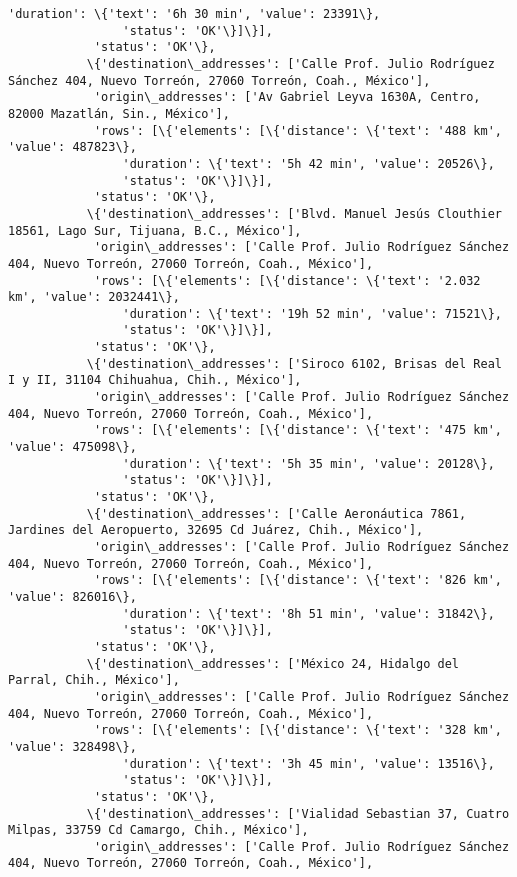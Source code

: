 \documentclass[11pt]{article}
\begin{document}
\begin{Verbatim}[commandchars=\\\{\}]
                'duration': \{'text': '6h 30 min', 'value': 23391\},
                'status': 'OK'\}]\}],
            'status': 'OK'\},
           \{'destination\_addresses': ['Calle Prof. Julio Rodríguez Sánchez 404, Nuevo Torreón, 27060 Torreón, Coah., México'],
            'origin\_addresses': ['Av Gabriel Leyva 1630A, Centro, 82000 Mazatlán, Sin., México'],
            'rows': [\{'elements': [\{'distance': \{'text': '488 km', 'value': 487823\},
                'duration': \{'text': '5h 42 min', 'value': 20526\},
                'status': 'OK'\}]\}],
            'status': 'OK'\},
           \{'destination\_addresses': ['Blvd. Manuel Jesús Clouthier 18561, Lago Sur, Tijuana, B.C., México'],
            'origin\_addresses': ['Calle Prof. Julio Rodríguez Sánchez 404, Nuevo Torreón, 27060 Torreón, Coah., México'],
            'rows': [\{'elements': [\{'distance': \{'text': '2.032 km', 'value': 2032441\},
                'duration': \{'text': '19h 52 min', 'value': 71521\},
                'status': 'OK'\}]\}],
            'status': 'OK'\},
           \{'destination\_addresses': ['Siroco 6102, Brisas del Real I y II, 31104 Chihuahua, Chih., México'],
            'origin\_addresses': ['Calle Prof. Julio Rodríguez Sánchez 404, Nuevo Torreón, 27060 Torreón, Coah., México'],
            'rows': [\{'elements': [\{'distance': \{'text': '475 km', 'value': 475098\},
                'duration': \{'text': '5h 35 min', 'value': 20128\},
                'status': 'OK'\}]\}],
            'status': 'OK'\},
           \{'destination\_addresses': ['Calle Aeronáutica 7861, Jardines del Aeropuerto, 32695 Cd Juárez, Chih., México'],
            'origin\_addresses': ['Calle Prof. Julio Rodríguez Sánchez 404, Nuevo Torreón, 27060 Torreón, Coah., México'],
            'rows': [\{'elements': [\{'distance': \{'text': '826 km', 'value': 826016\},
                'duration': \{'text': '8h 51 min', 'value': 31842\},
                'status': 'OK'\}]\}],
            'status': 'OK'\},
           \{'destination\_addresses': ['México 24, Hidalgo del Parral, Chih., México'],
            'origin\_addresses': ['Calle Prof. Julio Rodríguez Sánchez 404, Nuevo Torreón, 27060 Torreón, Coah., México'],
            'rows': [\{'elements': [\{'distance': \{'text': '328 km', 'value': 328498\},
                'duration': \{'text': '3h 45 min', 'value': 13516\},
                'status': 'OK'\}]\}],
            'status': 'OK'\},
           \{'destination\_addresses': ['Vialidad Sebastian 37, Cuatro Milpas, 33759 Cd Camargo, Chih., México'],
            'origin\_addresses': ['Calle Prof. Julio Rodríguez Sánchez 404, Nuevo Torreón, 27060 Torreón, Coah., México'],

\end{Verbatim}
\end{document}

